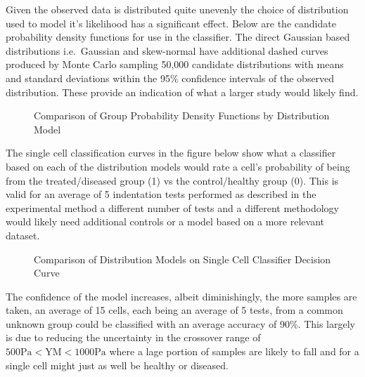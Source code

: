 \documentclass[
  paper=a4,
  ,captions=tableheading
]{scrartcl}
\makeatletter
\newcommand*\pandocbounded[1]{%
  \sbox\pandoc@box{#1}%
  \Gscale@div\@tempa{\textheight}{\dimexpr\ht\pandoc@box+\dp\pandoc@box\relax}%
  \Gscale@div\@tempb{\linewidth}{\wd\pandoc@box}%
  \ifdim\@tempb\p@<\@tempa\p@\let\@tempa\@tempb\fi%
  \ifdim\@tempa\p@<\p@\scalebox{\@tempa}{\usebox\pandoc@box}%
  \else\usebox{\pandoc@box}%
  \fi%
}
\makeatother
\begin{document}
Given the observed data is distributed quite unevenly the choice of
distribution used to model it's likelihood has a significant effect.
Below are the candidate probability density functions for use in the
classifier. The direct Gaussian based distributions i.e.~Gaussian and
skew-normal have additional dashed curves produced by Monte Carlo
sampling 50,000 candidate distributions with means and standard
deviations within the 95\% confidence intervals of the observed
distribution. These provide an indication of what a larger study would
likely find.

\begin{figure}
\centering
\pandocbounded{}
\caption{Comparison of Group Probability Density Functions by
Distribution Model}
\end{figure}

The single cell classification curves in the figure below show what a
classifier based on each of the distribution models would rate a cell's
probability of being from the treated/diseased group (1) vs the
control/healthy group (0). This is valid for an average of 5 indentation
tests performed as described in the experimental method a different
number of tests and a different methodology would likely need additional
controls or a model based on a more relevant dataset.

\begin{figure}
\centering
\pandocbounded{}
\caption{Comparison of Distribution Models on Single Cell Classifier
Decision Curve}
\end{figure}

The confidence of the model increases, albeit diminishingly, the more
samples are taken, an average of 15 cells, each being an average of 5
tests, from a common unknown group could be classified with an average
accuracy of 90\%. This largely is due to reducing the uncertainty in the
crossover range of \(500 \text{Pa} < \text{YM} < 1000 \text{Pa}\)
where a lage portion of samples are likely to fall and for a single cell
might just as well be healthy or diseased.
\end{document}
